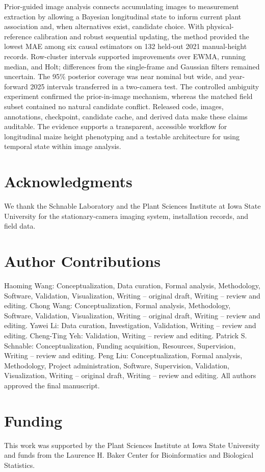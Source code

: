 \documentclass[12pt,letterpaper]{article}
\begin{document}
Prior-guided image analysis connects accumulating images to measurement extraction by allowing a Bayesian longitudinal state to inform current plant association and, when alternatives exist, candidate choice. With physical-reference calibration and robust sequential updating, the method provided the lowest MAE among six causal estimators on 132 held-out 2021 manual-height records. Row-cluster intervals supported improvements over EWMA, running median, and Holt; differences from the single-frame and Gaussian filters remained uncertain. The 95\% posterior coverage was near nominal but wide, and year-forward 2025 intervals transferred in a two-camera test. The controlled ambiguity experiment confirmed the prior-in-image mechanism, whereas the matched field subset contained no natural candidate conflict. Released code, images, annotations, checkpoint, candidate cache, and derived data make these claims auditable. The evidence supports a transparent, accessible workflow for longitudinal maize height phenotyping and a testable architecture for using temporal state within image analysis.

\section*{Acknowledgments}
We thank the Schnable Laboratory and the Plant Sciences Institute at Iowa State University for the stationary-camera imaging system, installation records, and field data.

\section*{Author Contributions}
Haoming Wang: Conceptualization, Data curation, Formal analysis, Methodology, Software, Validation, Visualization, Writing -- original draft, Writing -- review and editing. Chong Wang: Conceptualization, Formal analysis, Methodology, Software, Validation, Visualization, Writing -- original draft, Writing -- review and editing. Yawei Li: Data curation, Investigation, Validation, Writing -- review and editing. Cheng-Ting Yeh: Validation, Writing -- review and editing. Patrick S. Schnable: Conceptualization, Funding acquisition, Resources, Supervision, Writing -- review and editing. Peng Liu: Conceptualization, Formal analysis, Methodology, Project administration, Software, Supervision, Validation, Visualization, Writing -- original draft, Writing -- review and editing. All authors approved the final manuscript.

\section*{Funding}
This work was supported by the Plant Sciences Institute at Iowa State University and funds from the Laurence H. Baker Center for Bioinformatics and Biological Statistics.
\end{document}
